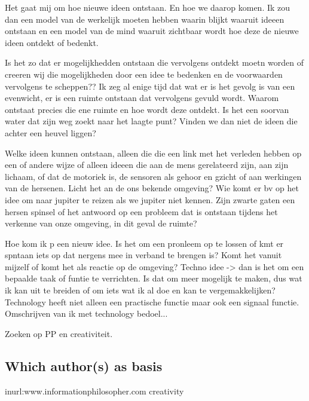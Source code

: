 \documentclass[a4paper]{Thesis}
\begin{document}
	
	Het gaat mij om hoe nieuwe ideen ontstaan. En hoe we daarop komen.
	Ik zou dan een model van de werkelijk moeten hebben waarin blijkt waaruit ideeen ontstaan en een model van de mind waaruit zichtbaar wordt hoe deze de nieuwe ideen ontdekt of bedenkt. 
	
	
	Is het zo dat er mogelijkhedden ontstaan die vervolgens ontdekt moetn worden of creeren wij die mogelijkheden door een idee te bedenken en de voorwaarden vervolgens te scheppen??
	Ik zeg al enige tijd dat wat er is het gevolg is van een evenwicht, er is een ruimte ontstaan dat vervolgens gevuld wordt.
	Waarom ontstaat precies die ene ruimte en hoe wordt deze ontdekt. Is het een soorvan water dat zijn weg zoekt naar het laagte punt? Vinden we dan niet de ideen die achter een heuvel liggen?
	
	
	Welke ideen kunnen ontstaan, alleen die die een link met het verleden hebben op een of andere wijze of alleen ideeen die aan de mens gerelateerd zijn, aan zijn lichaam, of dat de motoriek is, de sensoren als gehoor en gzicht of aan werkingen van de hersenen. Licht het an de ons bekende omgeving? Wie komt er bv op het idee om naar jupiter te reizen als we jupiter niet kennen. Zijn zwarte gaten een hersen spinsel of het antwoord op een probleem dat is ontstaan tijdens het verkenne van onze omgeving, in dit geval de ruimte?
	
	Hoe kom ik p een nieuw idee. Is het om een pronleem op te lossen of kmt er spntaan iets op dat nergens mee in verband te brengen is?
	Komt het vanuit mijzelf of komt het als reactie op de omgeving?
	Techno idee -> dan is het om een bepaalde taak of funtie te verrichten. Is dat om meer mogelijk te maken, dus wat ik kan uit te breiden of om iets wat ik al doe en kan te vergemakkelijken? Technology heeft niet alleen een practische functie maar ook een signaal functie.
	Omschrijven van ik met technology bedoel...
	
	Zoeken op PP en creativiteit.
	
	\subsection{Which author(s) as basis}
	inurl:www.informationphilosopher.com creativity
	
\end{document}
